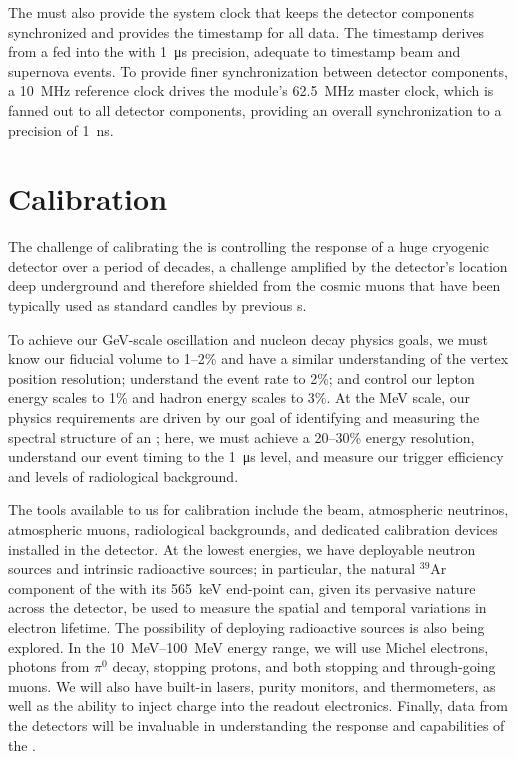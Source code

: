 The  must also provide the system clock that keeps the detector components synchronized and provides the timestamp for all data. The timestamp derives from a   fed into the  with \SI{1}{\micro\second} precision, adequate to timestamp beam and supernova events. To provide finer synchronization between detector components, a \SI{10}{\mega\hertz} reference clock drives the module's \SI{62.5}{\mega\hertz} master clock, which is fanned out to all detector components, providing an overall synchronization to a precision of \SI{1}{\nano\second}.

\section{Calibration}
\label{sec:exec-sp-calibration}

The challenge of calibrating the   is controlling the response of a huge cryogenic detector over a period of decades, a challenge amplified by the detector's location deep underground and therefore shielded from the cosmic muons that have been typically used as standard candles by previous s.

To achieve our \si{\giga\electronvolt}-scale oscillation and nucleon decay physics goals, we must know our fiducial volume to 1--2\% and have a similar understanding of the vertex position resolution; understand the \nue event rate to 2\%; and control our lepton energy scales to 1\% and hadron energy scales to 3\%. At the \si{\mega\electronvolt} scale, our physics requirements are driven by our goal of identifying and measuring the spectral structure of an ; here, we must achieve a 20--30\% energy resolution, understand our event timing to the \SI{1}{\micro\second} level, and measure our trigger efficiency and levels of radiological background. 

The tools available to us for calibration include the  beam, atmospheric neutrinos, atmospheric muons, radiological backgrounds, and dedicated calibration devices installed in the detector. At the lowest energies, we have deployable neutron sources and intrinsic radioactive sources; in particular, the natural $^{39}$Ar component of the  with its \SI{565}{\kilo\electronvolt} end-point can, given its pervasive nature across the detector, be used to measure the spatial and temporal variations in electron lifetime. The possibility of deploying radioactive sources is also being explored. In the \SIrange{10}{100}{\mega\electronvolt} energy range, we will use Michel electrons, photons from $\pi^{0}$ decay, stopping protons, and both stopping and through-going muons. We will also have built-in lasers, purity monitors, and thermometers, as well as the ability to inject charge into the readout electronics. Finally, data from the  detectors will be invaluable in understanding the response and  capabilities of the .



